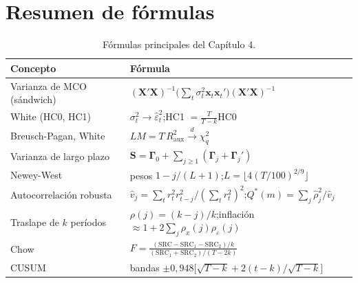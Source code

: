 \section{Resumen de fórmulas}

\begin{table}[H]
\centering\small
\begin{tabular}{@{}ll@{}}
\toprule
Concepto & Fórmula \\
\midrule
Varianza de MCO (sándwich) & $(\bm X'\bm X)^{-1}\bigl(\sum_t\sigma_t^2\bm x_t\bm x_t'\bigr)(\bm X'\bm X)^{-1}$ \\
White (HC0, HC1) & $\sigma_t^2\to\hat\varepsilon_t^2$;\quad HC1 $=\frac{T}{T-k}$HC0 \\
Breusch-Pagan, White & $LM=T\,R^2_{\mathrm{aux}}\xrightarrow{d}\chi^2_q$ \\
Varianza de largo plazo & $\bm S=\bm\Gamma_0+\sum_{j\ge1}(\bm\Gamma_j+\bm\Gamma_j')$ \\
Newey-West & pesos $1-j/(L+1)$;\quad $L=\lfloor4(T/100)^{2/9}\rfloor$ \\
Autocorrelación robusta & $\hat v_j=\sum_tr_t^2r_{t-j}^2/(\sum_tr_t^2)^2$;\quad $Q^*(m)=\sum_j\hat\rho_j^2/\hat v_j$ \\
Traslape de $k$ períodos & $\rho(j)=(k-j)/k$;\quad inflación $\approx1+2\sum_j\rho_x(j)\rho_\varepsilon(j)$ \\
Chow & $F=\frac{(\mathrm{SRC}-\mathrm{SRC}_1-\mathrm{SRC}_2)/k}{(\mathrm{SRC}_1+\mathrm{SRC}_2)/(T-2k)}$ \\
CUSUM & bandas $\pm0{,}948\bigl[\sqrt{T-k}+2(t-k)/\sqrt{T-k}\bigr]$ \\
\bottomrule
\end{tabular}
\caption{Fórmulas principales del Capítulo 4.}
\end{table}

